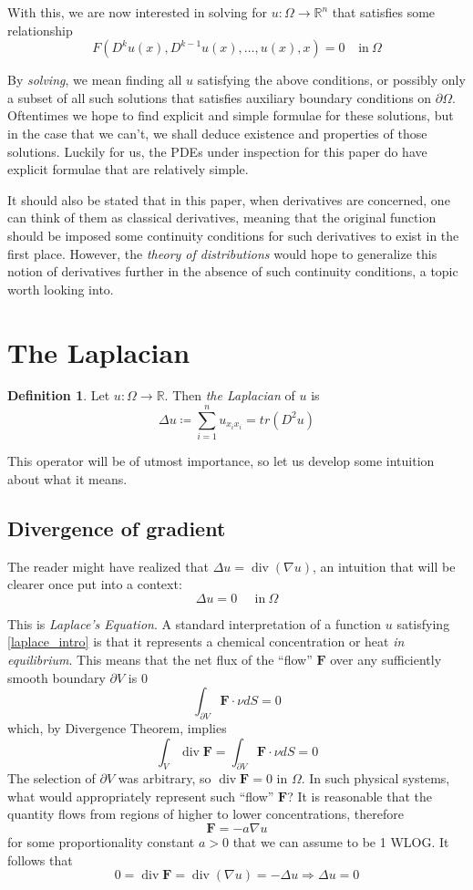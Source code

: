 \documentclass[openany, amssymb, psamsfonts]{amsart}
\theoremstyle{definition}
\newtheorem{defn}{Definition}[section]
\numberwithin{equation}{section}
\newcommand{\bbr}{\mathbb{R}}
\DeclareMathOperator{\Div}{div}
\let\implies\Rightarrow
\begin{document}
With this, we are now interested in solving for $u: \Omega \to \bbr^n$ that satisfies some relationship \[
    F(D^k u(x), D^{k-1}u(x), \ldots, u(x), x) = 0 \;\;\;\:\text{in}\: \Omega
\]

By \textit{solving}, we mean finding all $u$ satisfying the above conditions, or possibly only a subset of all such solutions that satisfies auxiliary boundary conditions on $\partial \Omega$. Oftentimes we hope to find explicit and simple formulae for these solutions, but in the case that we can't, we shall deduce existence and properties of those solutions. Luckily for us, the PDEs under inspection for this paper do have explicit formulae that are relatively simple.

It should also be stated that in this paper, when derivatives are concerned, one can think of them as classical derivatives, meaning that the original function should be imposed some continuity conditions for such derivatives to exist in the first place. However, the \textit{theory of distributions} would hope to generalize this notion of derivatives further in the absence of such continuity conditions, a topic worth looking into.
\section{The Laplacian}
\begin{defn}
    Let $u: \Omega \to \bbr$. Then \textit{the Laplacian} of $u$ is \[
        \Delta u \coloneqq \sum_{i=1}^{n} u_{x_i x_i} = tr(D^2 u)
    \]
\end{defn}

This operator will be of utmost importance, so let us develop some intuition about what it means.

\subsection{Divergence of gradient}
The reader might have realized that $\Delta u = \Div (\nabla u)$, an intuition that will be clearer once put into a context:
\begin{equation} \label{laplace_intro}
    \Delta u = 0 \;\;\;\;\; \text{in}\: \Omega
\end{equation}

This is \textit{Laplace's Equation}. A standard interpretation of a function $u$ satisfying \eqref{laplace_intro} is that it represents a chemical concentration or heat \textit{in equilibrium}. This means that the net flux of the ``flow'' $\mathbf{F}$ over any sufficiently smooth boundary $\partial V$ is 0
\[
    \int_{\partial V} \mathbf{F} \cdot \nu dS = 0
\]
which, by Divergence Theorem, implies \[
    \int_{V} \Div \mathbf{F} = \int_{\partial V} \mathbf{F} \cdot \nu dS = 0
\]
The selection of $\partial V $ was arbitrary, so $\Div \mathbf{F} = 0$ in $\Omega$. In such physical systems, what would appropriately represent such ``flow'' $\mathbf{F}$? It is reasonable that the quantity flows from regions of higher to lower concentrations, therefore \[
    \mathbf{F} = -a \nabla u
\] for some proportionality constant $a>0$ that we can assume to be 1 WLOG. It follows that \[
    0 = \Div \mathbf{F} = \Div (\nabla u) = - \Delta u \implies \Delta u = 0
\]
\end{document}
